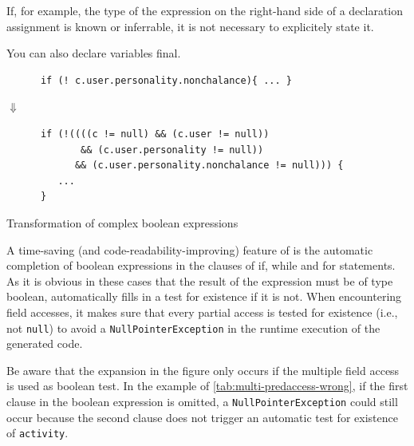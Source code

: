 If, for example, the type of the expression on the right-hand side of a
declaration assignment is known or inferrable, it is not necessary to
explicitely state it.

You can also declare variables final.

\begin{table}[htbp]
  \centering
  \begin{small}
    \begin{lstlisting}
      if (! c.user.personality.nonchalance){ ... }
    \end{lstlisting}

    {\Large$\Downarrow$}\\

    \begin{lstlisting}
      if (!((((c != null) && (c.user != null))
             && (c.user.personality != null))
            && (c.user.personality.nonchalance != null))) {
         ...
      }
\end{lstlisting}
\end{small}

\caption{Transformation of complex boolean expressions}
\label{tab:multi-predaccess}
\end{table}
\vspace*{10pt}


A time-saving (and code-readability-improving) feature of \vonda is the
automatic completion of boolean expressions in the clauses of if, while and for
statements. As it is obvious in these cases that the result of the expression
must be of type boolean, \vonda automatically fills in a test for existence if
it is not. When encountering field accesses, it makes sure that every
partial access is tested for existence (i.e., not \texttt{null}) to avoid a
\texttt{NullPointerException} in the runtime execution of the generated code.

Be aware that the expansion in the figure only occurs if the multiple field
access is used as boolean test. In the example of
\ref{tab:multi-predaccess-wrong}, if the first clause in the boolean expression
is omitted, a \texttt{NullPointerException} could still occur because the second clause does not trigger an automatic test for existence of \texttt{activity}.

